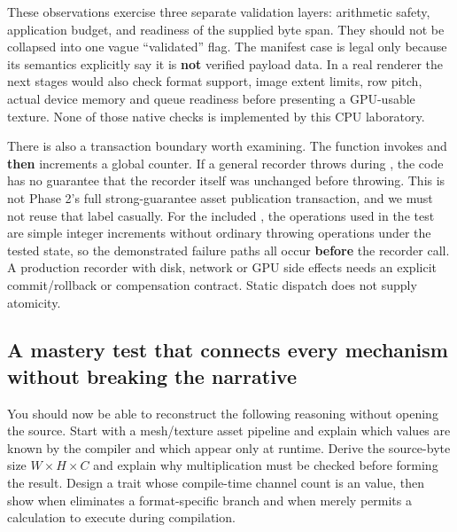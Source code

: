 These observations exercise three separate validation layers: arithmetic safety, application budget, and readiness of the supplied byte span. They should not be collapsed into one vague ``validated'' flag. The manifest case is legal only because its semantics explicitly say it is \textbf{not} verified payload data. In a real renderer the next stages would also check format support, image extent limits, row pitch, actual device memory and queue readiness before presenting a GPU-usable texture. None of those native checks is implemented by this CPU laboratory.

There is also a transaction boundary worth examining. The  function invokes  and \textbf{then} increments a global counter. If a general recorder throws during , the code has no guarantee that the recorder itself was unchanged before throwing. This is not Phase 2's full strong-guarantee asset publication transaction, and we must not reuse that label casually. For the included , the operations used in the test are simple integer increments without ordinary throwing operations under the tested state, so the demonstrated failure paths all occur \textbf{before} the recorder call. A production recorder with disk, network or GPU side effects needs an explicit commit/rollback or compensation contract. Static dispatch does not supply atomicity.

\subsection{A mastery test that connects every mechanism without breaking the narrative}\label{05-engine-i-ch005-a-mastery-test-that-connects-every-mechanism-without-breaking-the-narrative}

\hypertarget{05-engine-i-ch005-a-mastery-test-that-connects-every-mechanism-without-breaking-the-narrative}{}

You should now be able to reconstruct the following reasoning without opening the source. Start with a mesh/texture asset pipeline and explain which values are known by the compiler and which appear only at runtime. Derive the source-byte size \(W\times H\times C\) and explain why multiplication must be checked before forming the result. Design a trait whose compile-time channel count is an  value, then show when  eliminates a format-specific branch and when  merely permits a calculation to execute during compilation.

